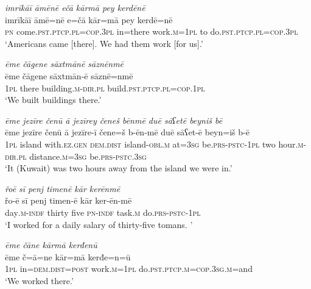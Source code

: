 \ea \label{ŽM.39}
\textit{imrīkāī āmēnē ečā kārmā pey kerdēnē} \\ 
\gll imrīkāī āmē=nē e=čā kār=mā pey kerdē=nē \\ 
 \textsc{pn} come\textsc{.pst}\textsc{.ptcp}\textsc{.pl}\textsc{=cop}\textsc{.3pl} in=there work\textsc{.m}\textsc{=\textsc{1pl}} to do\textsc{.pst}\textsc{.ptcp}\textsc{.pl}\textsc{=cop}\textsc{.3pl} \\ 
\glt `Americans came [there]. We had them work [for us].'
\z 
 
\ea \label{ŽM.40}
\textit{ēme čāgene sāxtmānē sāznēnmē} \\ 
\gll ēme čāgene sāxtmān-ē sāznē=nmē \\ 
 \textsc{1pl} there building\textsc{.m}\textsc{-dir}\textsc{.pl} build\textsc{.pst}\textsc{.ptcp}\textsc{.pl}\textsc{=cop}\textsc{.\textsc{1pl}} \\ 
\glt `We built buildings there.'
\z 
 
\ea \label{ŽM.45}
\textit{ēme jezīre čenū ā jezīrey čeneš bēnmē duē sāʕetē beyniš bē} \\ 
\gll ēme jezīre čenū ā jezīre-ī čene=š b-ēn-mē duē sāʕet-ē beyn=iš b-ē \\ 
 \textsc{1pl} island with\textsc{\textsc{.ez}.gen} \textsc{dem.dist} island\textsc{-obl}\textsc{.m} at\textsc{=3sg} be\textsc{.prs}\textsc{-pstc}\textsc{-\textsc{1pl}} two hour\textsc{.m}\textsc{-dir}\textsc{.pl} distance\textsc{.m}\textsc{=3sg} be\textsc{.prs}\textsc{-pstc}\textsc{.3sg} \\ 
\glt `It (Kuwait) was two hours away from the island we were in.'
\z 
 
\ea \label{ŽM.46}
\textit{řoē sī penj timenē kār kerēnmē} \\ 
\gll řo-ē sī penj timen-ē kār ker-ēn-mē \\ 
 day\textsc{.m}\textsc{-indf} thirty five \textsc{pn}\textsc{-indf} task\textsc{.m} do\textsc{.prs}\textsc{-pstc}\textsc{-\textsc{1pl}} \\ 
\glt `I worked for a daily salary of thirty-five tomans. '
\z 
 
\ea \label{ŽM.50}
\textit{ēme čāne kārmā kerđenū} \\ 
\gll ēme č=ā=ne kār=mā kerđe=n=ū \\ 
 \textsc{1pl} in=\textsc{dem.dist}\textsc{=\textsc{post}} work\textsc{.m}\textsc{=\textsc{1pl}} do\textsc{.pst}\textsc{.ptcp}\textsc{.m}\textsc{=cop}\textsc{.3sg}\textsc{.m}=and \\ 
\glt `We worked there.'
\z 
 
